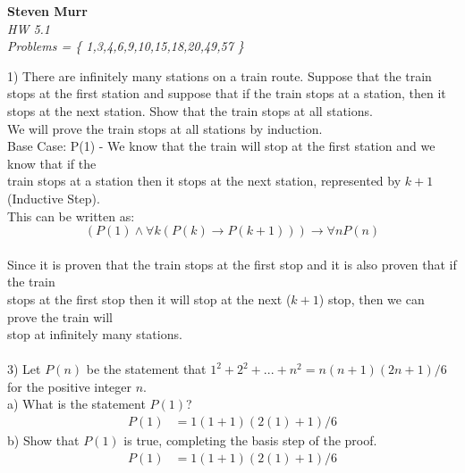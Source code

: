 \documentclass{article}
\begin{document}
\setcounter{totalnumber}{5}
   \begin{flushright}
      \Large\textbf{Steven Murr}\\
      \large\textit{HW 5.1} \\
      \large\textit{ Problems = \{ 1,3,4,6,9,10,15,18,20,49,57 \} } \\
   \end{flushright}
\begin{flushleft}
\makeatletter%
\setlength{\@fptop}{5pt}
\makeatother

\setlength\parindent{0pt}1) There are infinitely many stations on a train route.  Suppose that the train stops at the first station and suppose that if the train stops at a station, then it stops at the next station.  Show that the train stops at all stations. \\
\setlength\parindent{24pt} We will prove the train stops at all stations by induction. \\
\setlength\parindent{48pt} Base Case: P(1) - We know that the train will stop at the first station and we know that if the\\ train stops at a station then it stops at the next station, represented by $k+1$ (Inductive Step).  \\This can be written as: 
\begin{equation}
(P(1) \land \forall k(P(k) \rightarrow P(k+1))) \rightarrow \forall n P(n)
\end{equation} \\
\setlength\parindent{48pt} Since it is proven that the train stops at the first stop and it is also proven that if the train \\stops at the first stop then it will stop at the next ($k+1$) stop, then we can prove the train will \\stop at infinitely many stations. \\
~\\
\setlength\parindent{0pt}3) Let $P(n)$ be the statement that $1^2 + 2^2 + ... + n^2 = n(n+1)(2n+1)/6$ for the positive integer $n$. \\
\setlength\parindent{24pt}a) What is the statement $P(1)$?
\begin{align*}
P(1) &= 1(1+1)(2(1) + 1) / 6 
\end{align*}
\setlength\parindent{24pt}b) Show that $P(1)$ is true, completing the basis step of the proof.
\begin{align*}
P(1) &= 1(1+1)(2(1) + 1) / 6 \\

\end{align*}
\end{flushleft}
\end{document}
